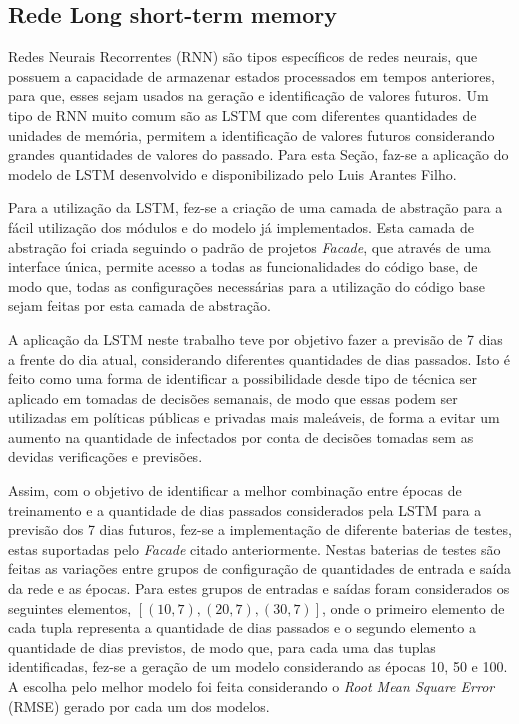 \documentclass[a4paper,12pt]{article}
\begin{document}
\subsection{Rede Long short-term memory}

\par Redes Neurais Recorrentes (RNN) são tipos específicos de redes neurais, que possuem a capacidade de armazenar estados processados em tempos anteriores, para que, esses sejam usados na geração e identificação de valores futuros. Um tipo de RNN muito comum são as LSTM que com diferentes quantidades de unidades de memória, permitem a identificação de valores futuros considerando grandes quantidades de valores do passado. Para esta Seção, faz-se a aplicação do modelo de LSTM desenvolvido e disponibilizado pelo Luis Arantes Filho.

\par Para a utilização da LSTM, fez-se a criação de uma camada de abstração para a fácil utilização dos módulos e do modelo já implementados. Esta camada de abstração foi criada seguindo o padrão de projetos \textit{Facade}, que através de uma interface única, permite acesso a todas as funcionalidades do código base, de modo que, todas as configurações necessárias para a utilização do código base sejam feitas por esta camada de abstração.

\par A aplicação da LSTM neste trabalho teve por objetivo fazer a previsão de 7 dias a frente do dia atual, considerando diferentes quantidades de dias passados. Isto é feito como uma forma de identificar a possibilidade desde tipo de técnica ser aplicado em tomadas de decisões semanais, de modo que essas podem ser utilizadas em políticas públicas e privadas mais maleáveis, de forma a evitar um aumento na quantidade de infectados por conta de decisões tomadas sem as devidas verificações e previsões. 

\par Assim, com o objetivo de identificar a melhor combinação entre épocas de treinamento e a quantidade de dias passados considerados pela LSTM para a previsão dos 7 dias futuros, fez-se a implementação de diferente baterias de testes, estas suportadas pelo \textit{Facade} citado anteriormente. Nestas baterias de testes são feitas as variações entre grupos de configuração de quantidades de entrada e saída da rede e as épocas.  Para estes grupos de entradas e saídas foram considerados os seguintes elementos, $[(10, 7), (20, 7), (30, 7)]$, onde o primeiro elemento de cada tupla representa a quantidade de dias passados e o segundo elemento a quantidade de dias previstos, de modo que, para cada uma das tuplas identificadas, fez-se a geração de um modelo considerando as épocas 10, 50 e 100. A escolha pelo melhor modelo foi feita considerando o \textit{Root Mean Square Error} (RMSE) gerado por cada um dos modelos.
\end{document}
